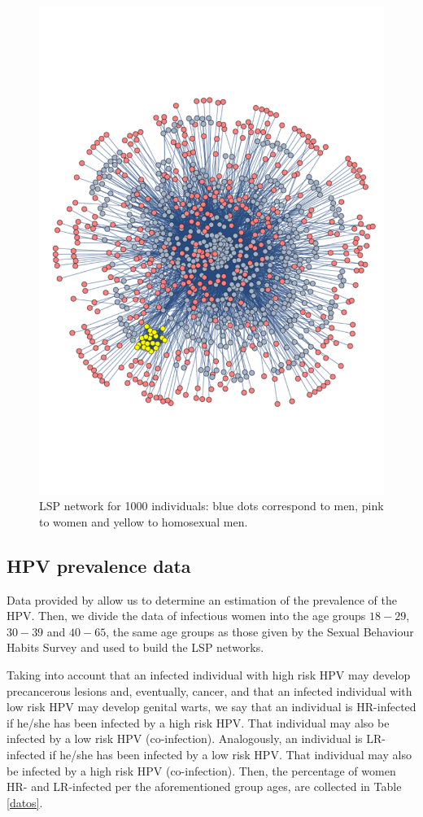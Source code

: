 \begin{figure}[h]
	\centering
	\includegraphics[scale=0.4]{red.pdf}
	\caption{LSP network for 1000 individuals: blue dots correspond to men, pink to women and yellow to homosexual men.}
	\label{red}
\end{figure}

\subsection{HPV prevalence data}
Data provided by \cite{castellsague2012prevalence} allow us to determine an estimation of the prevalence of the HPV. Then, we divide the data of infectious women into the age groups $18-29$, $30-39$ and $40-65$, the same age groups as those given by the Sexual Behaviour Habits Survey \cite{INE} and used to build the LSP networks. 

Taking into account that an infected individual with high risk HPV may develop precancerous lesions and, eventually, cancer, and that an infected individual with low risk HPV may develop genital warts, we say that an individual is HR-infected if he/she has been infected by a high risk HPV. That individual may also be infected by a low risk HPV (co-infection). Analogously, an individual is LR-infected if he/she has been infected by a low risk HPV. That individual may also be infected by a high risk HPV (co-infection). Then, the percentage of women HR- and LR-infected per the aforementioned group ages, are collected in Table \ref{datos}. 


